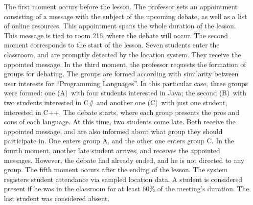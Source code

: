\documentclass[5p,authoryear]{elsarticle}
\begin{document}
The first moment occurs before the lesson. The professor sets an appointment
consisting of a message with the subject of the upcoming debate, as well as a
list of online resources. This appointment spans the whole duration of the
lesson. This message is tied to room 216, where the debate will occur. The
second moment corresponds to the start of the lesson. Seven students enter the
classroom, and are promptly detected by the location system. They receive the
appointed message. In the third moment, the professor requests the formation of
groups for debating. The groups are formed according with similarity between
user interests for ``Programming Languages''. In this particular case, three
groups were formed: one (A)~with four students interested in Java; the second
(B)~with two students interested in C\# and another one (C)~with just one
student, interested in C++. The debate starts, where each group presents the
pros and cons of each language. At this time, two students come late. Both
receive the appointed message, and are also informed about what group they
should participate in. One enters group A, and the other one enters group C. In
the fourth moment, another late student arrives, and receives the appointed
messages. However, the debate had already ended, and he is not directed to any
group. The fifth moment occurs after the ending of the lesson. The system
registers student attendance via sampled location data. A student is considered
present if he was in the classroom for at least 60\% of the meeting's duration.
The last student was considered absent.
\end{document}
